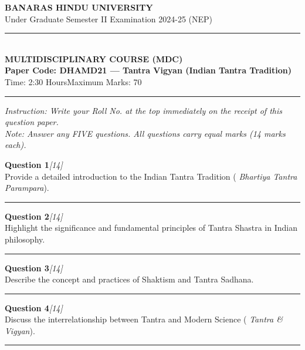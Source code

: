 \documentclass[11pt,a4paper]{article}
\newcommand{\pts}[1]{\hfill   \textit{[#1]}}
\begin{document}
\begin{center}
  {\large\bfseries BANARAS HINDU UNIVERSITY}\\[2pt]
  {\normalsize Under Graduate Semester II Examination 2024-25 (NEP)}\\[6pt]
  \rule{0.8\linewidth}{0.5pt}\\[6pt]
  {\large\bfseries MULTIDISCIPLINARY COURSE (MDC)}\\[4pt]
  {\large\bfseries Paper Code: DHAMD21 --- Tantra Vigyan (Indian Tantra Tradition)}\\[4pt]
  {\normalsize Time: 2:30 Hours\hfill Maximum Marks: 70}
\end{center}

\rule{\linewidth}{0.4pt}\smallskip



\noindent   \textit{Instruction: Write your Roll No. at the top immediately on the receipt of this question paper.}\\[2pt]



\noindent   \textit{Note: Answer any FIVE questions. All questions carry equal marks (14 marks each).}
\bigskip




\noindent   \textbf{Question 1}\pts{14} \\
Provide a detailed introduction to the Indian Tantra Tradition (   \textit{Bhartiya Tantra Parampara}).

\medskip\rule{\linewidth}{0.2pt}\medskip




\noindent   \textbf{Question 2}\pts{14} \\
Highlight the significance and fundamental principles of Tantra Shastra in Indian philosophy.

\medskip\rule{\linewidth}{0.2pt}\medskip




\noindent   \textbf{Question 3}\pts{14} \\
Describe the concept and practices of Shaktism and Tantra Sadhana.

\medskip\rule{\linewidth}{0.2pt}\medskip




\noindent   \textbf{Question 4}\pts{14} \\
Discuss the interrelationship between Tantra and Modern Science (   \textit{Tantra \& Vigyan}).

\medskip\rule{\linewidth}{0.2pt}\medskip
\end{document}
